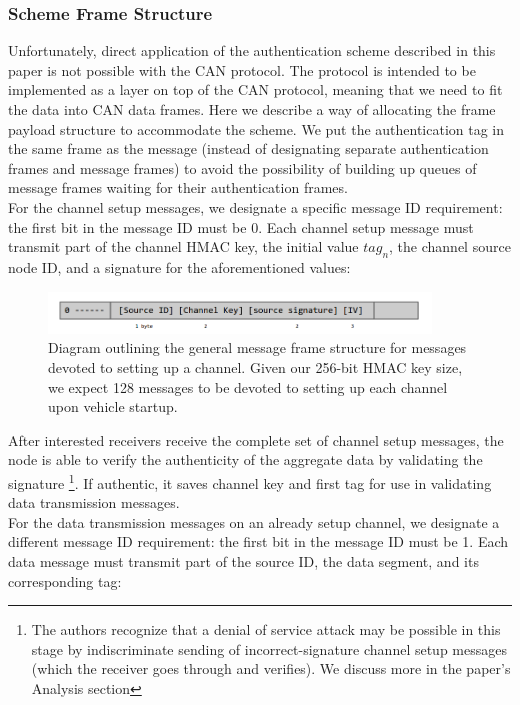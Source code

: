 \documentclass{article}
\begin{document}
    \subsubsection{Scheme Frame Structure}
    Unfortunately, direct application of the authentication scheme described in this paper is not possible with the CAN protocol. The protocol is intended to be implemented as a layer on top of the CAN protocol, meaning that we need to fit the data into CAN data frames. Here we describe a way of allocating the frame payload structure to accommodate the scheme. We put the authentication tag in the same frame as the message (instead of designating separate authentication frames and message frames) to avoid the possibility of building up queues of message frames waiting for their authentication frames.\\
    
    For the channel setup messages, we designate a specific message ID requirement: the first bit in the message ID must be 0. Each channel setup message must transmit part of the channel HMAC key, the initial value $tag_n$, the channel source node ID, and a signature for the aforementioned values:\\
   
\begin{figure}[h]
  \centering
  \includegraphics[width=4in]{channel-setup-frame}
  \caption {Diagram outlining the general message frame structure for messages devoted to setting up a channel. Given our 256-bit HMAC key size, we expect 128 messages to be devoted to setting up each channel upon vehicle startup.}
\end{figure}

    After interested receivers receive the complete set of channel setup messages, the node is able to verify the authenticity of the aggregate data by validating the signature \footnote{The authors recognize that a denial of service attack may be possible in this stage by indiscriminate sending of incorrect-signature channel setup messages (which the receiver goes through and verifies). We discuss more in the paper's Analysis section}. If authentic, it saves channel key and first tag for use in validating data transmission messages.\\

     For the data transmission messages on an already setup channel, we designate a different message ID requirement: the first bit in the message ID must be 1. Each data message must transmit part of the source ID, the data segment, and its corresponding tag: \\
\end{document}
